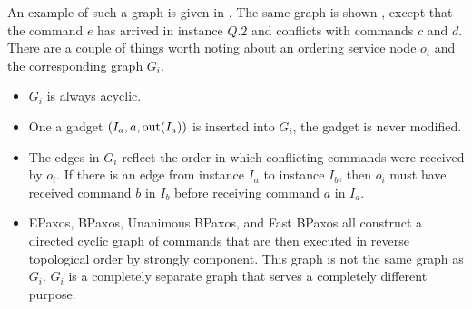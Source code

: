 \documentclass{mwhittaker}
\theoremstyle{definition}
\begin{document}
An example of such a graph is given in
. The same graph is shown
, except that the command $e$ has
arrived in instance $Q.2$ and conflicts with commands $c$ and $d$.
%
There are a couple of things worth noting about an ordering service node $o_i$
and the corresponding graph $G_i$.
\begin{itemize}
  \item
    $G_i$ is always acyclic.
  \item
    One a gadget $(I_a, a, \text{out}(I_a))$ is inserted into $G_i$, the gadget is
    never modified.
  \item
    The edges in $G_i$ reflect the order in which conflicting commands were
    received by $o_i$. If there is an edge from instance $I_a$ to instance
    $I_b$, then $o_i$ must have received command $b$ in $I_b$ before receiving
    command $a$ in $I_a$.
  \item
    EPaxos, BPaxos, Unanimous BPaxos, and Fast BPaxos all construct a directed
    cyclic graph of commands that are then executed in reverse topological
    order by strongly component. This graph is not the same graph as $G_i$.
    $G_i$ is a completely separate graph that serves a completely different
    purpose.
\end{itemize}
\end{document}
